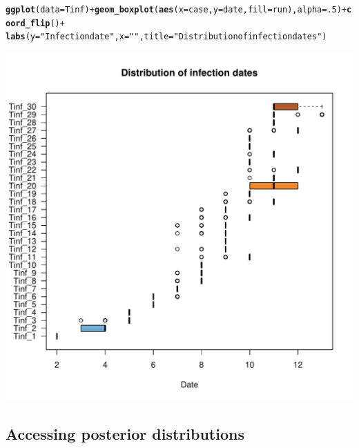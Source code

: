 \documentclass{article}\usepackage[]{graphicx}\usepackage[]{color}
\makeatletter
\newcommand{\hlnum}[1]{\textcolor[rgb]{0.686,0.059,0.569}{#1}}%
\newcommand{\hlstr}[1]{\textcolor[rgb]{0.192,0.494,0.8}{#1}}%
\newcommand{\hlopt}[1]{\textcolor[rgb]{0,0,0}{#1}}%
\newcommand{\hlstd}[1]{\textcolor[rgb]{0.345,0.345,0.345}{#1}}%
\newcommand{\hlkwc}[1]{\textcolor[rgb]{0.333,0.667,0.333}{#1}}%
\newcommand{\hlkwd}[1]{\textcolor[rgb]{0.737,0.353,0.396}{\textbf{#1}}}%
\newenvironment{kframe}{%
 \def\at@end@of@kframe{}%
 \ifinner\ifhmode%
  \def\at@end@of@kframe{\end{minipage}}%
  \begin{minipage}{\columnwidth}%
 \fi\fi%
 \def\FrameCommand##1{\hskip\@totalleftmargin \hskip-\fboxsep
 \colorbox{shadecolor}{##1}\hskip-\fboxsep
     \hskip-\linewidth \hskip-\@totalleftmargin \hskip\columnwidth}%
 \MakeFramed {\advance\hsize-\width
   \@totalleftmargin\z@ \linewidth\hsize
   \@setminipage}}%
 {\par\unskip\endMakeFramed%
 \at@end@of@kframe}
\newenvironment{knitrout}{}{} %
\makeatother
\begin{document}
\begin{knitrout}
\color{fgcolor}\begin{kframe}
\begin{alltt}
\hlkwd{ggplot}\hlstd{(}\hlkwc{data}\hlstd{=Tinf)} \hlopt{+} \hlkwd{geom_boxplot}\hlstd{(}\hlkwd{aes}\hlstd{(}\hlkwc{x}\hlstd{=case,}\hlkwc{y}\hlstd{=date,}\hlkwc{fill}\hlstd{=run),}\hlkwc{alpha}\hlstd{=}\hlnum{.5}\hlstd{)} \hlopt{+} \hlkwd{coord_flip}\hlstd{()} \hlopt{+}
    \hlkwd{labs}\hlstd{(}\hlkwc{y}\hlstd{=}\hlstr{"Infection date"}\hlstd{,} \hlkwc{x}\hlstd{=}\hlstr{""}\hlstd{,} \hlkwc{title}\hlstd{=}\hlstr{"Distribution of infection dates"}\hlstd{)}
\end{alltt}
\end{kframe}

{\centering \includegraphics[width=.6\textwidth]{figs/unnamed-chunk-30} 

}



\end{knitrout}





\subsection{Accessing posterior distributions}
\end{document}
